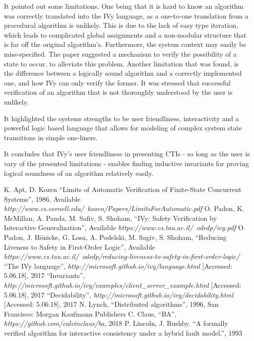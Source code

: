 \documentclass[fleqn]{article}
\begin{document}
It pointed out some limitations. One being that it is hard to know an algorithm was correctly translated into the IVy language, as a one-to-one translation from a procedural algorithm is unlikely. This is due to the lack of easy type iteration, which leads to complicated global assignments and a non-modular structure that is far off the original algorithm's.
Furthermore, the system context may easily be miss-specified. The paper suggested a mechanism to verify the possibility of a state to occur, to alleviate this problem.
Another limitation that was found, is the difference between a logically sound algorithm and a correctly implemented one, and how IVy can only verify the former.
It was stressed that successful verification of an algorithm that is not thoroughly understood by the user is unlikely.

It highlighted the systems strengths to be user friendliness, interactivity and a powerful logic based language that allows for
modeling of complex system state transitions in simple one-liners.

It concludes that IVy's user friendliness in presenting CTIs - so long as the user is vary of the presented limitations - enables
finding inductive invariants for proving logical soundness of an algorithm relatively easily.



\begin{thebibliography}{99}
     K. Apt, D. Kozen ``Limits of Automatic Verification of Finite-State Concurrent Systems'', 1986, Available \textit{http://www.cs.cornell.edu/~kozen/Papers/LimitsForAutomatic.pdf}
     O. Padon, K. McMillan, A. Panda, M. Safiv, S. Shoham, ``IVy: Safety Verification by Interactive Generalization'', Available \textit{https://www.cs.tau.ac.il/~odedp/ivy.pdf}
     O. Padon, J. Hönicke, G. Losa, A. Podelski, M. Sagiv, S. Shoham, ``Reducing Liveness to Safety in First-Order Logic'', Available \textit{https://www.cs.tau.ac.il/~odedp/reducing-liveness-to-safety-in-first-order-logic/}
     ``The IVy language'',  \textit{http://microsoft.github.io/ivy/language.html} [Accessed: 5.06.18], 2017
     ``Invariants'',  \textit{http://microsoft.github.io/ivy/examples/client\_server\_example.html} [Accessed: 5.06.18], 2017
     ``Decidability'',  \textit{http://microsoft.github.io/ivy/decidability.html} [Accessed: 5.06.18], 2017
     N. Lynch, ``Distributed algorithms'', 1996, San Francisco: Morgan Kaufmann Publishers
     C. Claus, ``BA'', \textit{https://github.com/calvinclaus/ba}, 2018
     P. Lincoln, J. Rushby. ``A formally verified algorithm for interactive consistency under a hybrid fault model.'', 1993

\end{thebibliography}

\end{document}
